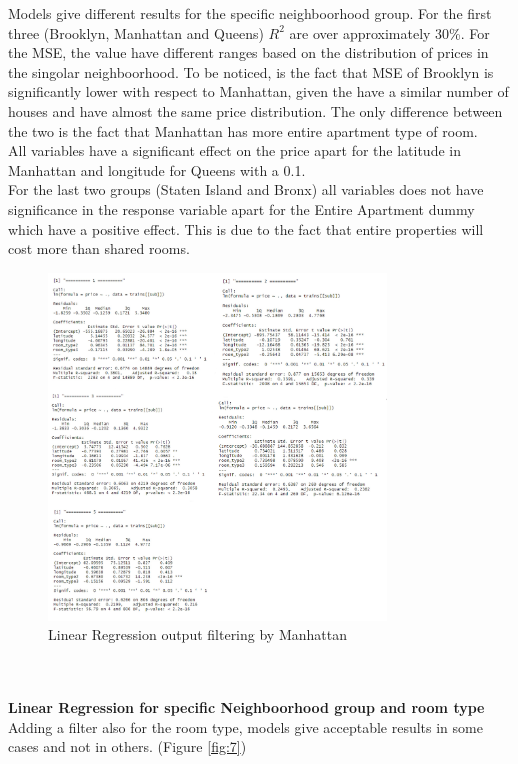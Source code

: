 \documentclass{FR16}
\begin{document}
\noindent Models give different results for the specific neighboorhood group. For the first three (Brooklyn, Manhattan and Queens) $R^2$ are over approximately 30\%. For the MSE, the value have different ranges based on the distribution of prices in the singolar neighboorhood. To be noticed, is the fact that MSE of Brooklyn is significantly lower with respect to Manhattan, given the have a similar number of houses and have almost the same price distribution. The only difference between the two is the fact that Manhattan has more entire apartment type of room. 
\\ All variables have a significant effect on the price apart for the latitude in Manhattan and longitude for Queens with a 0.1.  \\
For the last two groups (Staten Island and Bronx) all variables does not have significance in the response variable apart for the Entire Apartment dummy which have a positive effect. This is due to the fact that entire properties will cost more than shared rooms.
\begin{figure}[H]
\centering
\includegraphics[width=0.8\textwidth]{figures/lm2.jpg} 
\caption{\label{fig:6}  Linear Regression output filtering by  Manhattan}
\end{figure}
\noindent \\\\  \textbf{Linear Regression for specific Neighboorhood group and room type}\\
\noindent Adding a filter also for the room type, models give acceptable results in some cases and not in others. (Figure \ref{fig:7}) 
\end{document}
